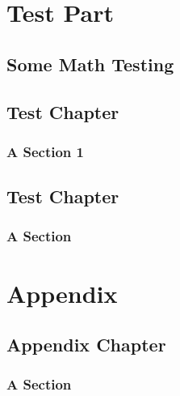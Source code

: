 \documentclass[11pt,paper=a5,footinclude=true,headinclude=true]{scrbook} %
\begin{document}
    
    \tableofcontents 


    \cleardoublepage\part{Test Part}
    \chapter{Some Math Testing}
    \lipsum[1]
        
    \chapter{Test Chapter}
    \lipsum[1]

    \section{A Section 1}
    \lipsum[1]
    
    \lipsum[2]
    
    \lipsum[3]
    
    \lipsum[4]
    
    \chapter{Test Chapter}
    \lipsum[1]
    
    \section{A Section}
    \lipsum[1]

%   

    \appendix
    \cleardoublepage\part{Appendix}
    \chapter{Appendix Chapter}
    \lipsum[1]
    
    \section{A Section}
    \lipsum[1]
\end{document}
